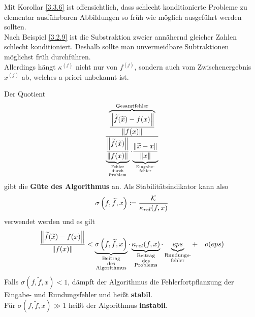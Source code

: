 \begin{Beme}
  Mit Korollar \ref{3.3.6} ist offensichtlich, dass schlecht konditionierte Probleme 
  zu elementar ausführbaren Abbildungen so früh wie möglich ausgeführt werden sollten. \\
  Nach Beispiel \ref{3.2.9} ist die Substraktion zweier annähernd gleicher Zahlen schlecht konditioniert.
  Deshalb sollte man unvermeidbare Subtraktionen möglichst früh durchführen. \\
  Allerdings hängt $\kappa^{(j)}$ nicht nur von $f^{(j)}$, sondern auch vom 
  Zwischenergebnis $x^{(j)}$ ab, welches a priori unbekannt ist.
\end{Beme}

\begin{Beme}[Sprechweise]
  Der Quotient 
  \begin{gather}
    \frac{\overbrace{\frac{\left\| \widetilde{f}(\widetilde{x})-f(x) \right\|}{\left\| f(x) \right\|}}^{
        \text{Gesamtfehler}}}
    {\underbrace{\frac{\left\| \widetilde{f}(\widetilde{x}) \right\|}{\left\| f(x) \right\|}}_{
        \scriptsize\substack{
          \text{Fehler} \\
          \text{durch} \\
          \text{Problem}
        }}
      \cdot
      {\underbrace{\frac{\left\| \widetilde{x}-x \right\|}{\left\| x \right\|}}_{
          \scriptsize\substack{\text{Eingabe-} \\ \text{fehler}}}}}
    \label{III.3.6}
  \end{gather}
  gibt die \textbf{Güte des Algorithmus}  an.
  Als Stabilitätsindikator kann also 
  \begin{gather}
    \sigma\left(f, \widetilde{f}, x\right) \coloneqq \frac{\mathcal{K}}{\kappa_{rel}(f, x)}
    \label{III.3.7}
  \end{gather}
  verwendet werden und es gilt
  \begin{gather*}
    \frac{\left\| \widetilde{f}(\widetilde{x})-f(x) \right\|}{\left\| f(x) \right\|}
    < \underbrace{\sigma\left( f,\widetilde{f}, x\right) }_{
      \substack{\text{Beitrag}\\
        \text{des} \\
        \text{Algorithmus}}}
    \cdot \underbrace{\kappa_{rel}(f,x)}_{
      \substack{\text{Beitrag} \\
        \text{des} \\
        \text{Problems}}}
    \cdot \underbrace{eps}_{\substack{\text{Rundungs-}\\\text{fehler}}}
    + \quad o(eps)
  \end{gather*}
  Falls $\sigma( f,\widetilde{f}, x)  < 1$, dämpft der Algorithmus die Fehlerfortpflanzung der Eingabe- und Rundungsfehler und heißt \textbf{stabil}. \\
  Für $\sigma( f,\widetilde{f}, x)  \gg 1$ heißt der Algorithmus \textbf{instabil}.
\end{Beme}



